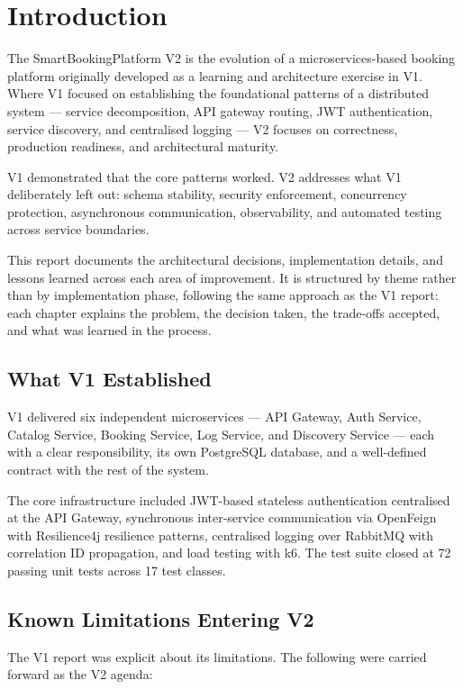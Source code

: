 \section{Introduction}

The SmartBookingPlatform V2 is the evolution of a microservices-based booking platform originally developed as a learning and architecture exercise in V1. Where V1 focused on establishing the foundational patterns of a distributed system --- service decomposition, API gateway routing, JWT authentication, service discovery, and centralised logging --- V2 focuses on correctness, production readiness, and architectural maturity.

V1 demonstrated that the core patterns worked. V2 addresses what V1 deliberately left out: schema stability, security enforcement, concurrency protection, asynchronous communication, observability, and automated testing across service boundaries.

This report documents the architectural decisions, implementation details, and lessons learned across each area of improvement. It is structured by theme rather than by implementation phase, following the same approach as the V1 report: each chapter explains the problem, the decision taken, the trade-offs accepted, and what was learned in the process.

\subsection{What V1 Established}

V1 delivered six independent microservices --- API Gateway, Auth Service, Catalog Service, Booking Service, Log Service, and Discovery Service --- each with a clear responsibility, its own PostgreSQL database, and a well-defined contract with the rest of the system.

The core infrastructure included JWT-based stateless authentication centralised at the API Gateway, synchronous inter-service communication via OpenFeign with Resilience4j resilience patterns, centralised logging over RabbitMQ with correlation ID propagation, and load testing with k6. The test suite closed at 72 passing unit tests across 17 test classes.

\subsection{Known Limitations Entering V2}

The V1 report was explicit about its limitations. The following were carried forward as the V2 agenda:

